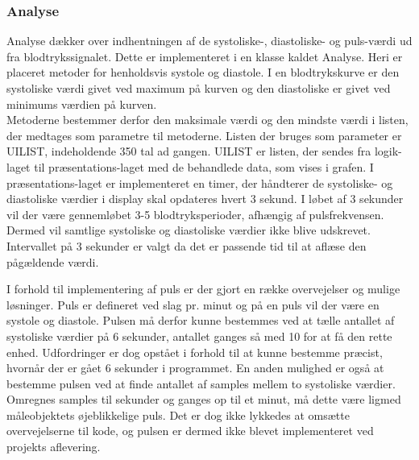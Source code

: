 \subsubsection{Analyse}
Analyse dækker over indhentningen af de systoliske-, diastoliske- og puls-værdi ud fra blodtrykssignalet. Dette er implementeret i en klasse kaldet Analyse. Heri er placeret metoder for henholdsvis systole og diastole. I en blodtrykskurve er den systoliske værdi givet ved maximum på kurven og den diastoliske er givet ved minimums værdien på kurven. \\
Metoderne bestemmer derfor den maksimale værdi og den mindste værdi i listen, der medtages som parametre til metoderne. Listen der bruges som parameter er UILIST, indeholdende 350 tal ad gangen. UILIST er listen, der sendes fra logik-laget til præsentations-laget med de behandlede data, som vises i grafen. I præsentations-laget er implementeret en timer, der håndterer de systoliske- og diastoliske værdier i display skal opdateres hvert 3 sekund. I løbet af 3 sekunder vil der være gennemløbet 3-5 blodtryksperioder, afhængig af pulsfrekvensen. Dermed vil samtlige systoliske og diastoliske værdier ikke blive udskrevet. Intervallet på 3 sekunder er valgt da det er passende tid til at aflæse den pågældende værdi.

I forhold til implementering af puls er der gjort en række overvejelser og mulige løsninger. Puls er defineret ved slag pr. minut og på en puls vil der være en systole og diastole. Pulsen må derfor kunne bestemmes ved at tælle antallet af systoliske værdier på 6 sekunder, antallet ganges så med 10 for at få den rette enhed. Udfordringer er dog opstået i forhold til at kunne bestemme præcist, hvornår der er gået 6 sekunder i programmet. En anden mulighed er også at bestemme pulsen ved at finde antallet af samples mellem to systoliske værdier. Omregnes samples til sekunder og ganges op til et minut, må dette være ligmed måleobjektets øjeblikkelige puls. Det er dog ikke lykkedes at omsætte overvejelserne til kode, og pulsen er dermed ikke blevet implementeret ved projekts aflevering.


